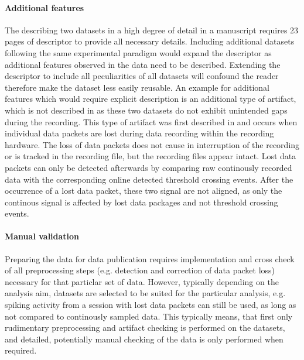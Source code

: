 \paragraph{Additional features}
The describing two datasets in a high degree of detail in a manuscript requires 23 pages of descriptor to provide all necessary details. Including additional datasets following the same experimental paradigm would expand the descriptor as additional features observed in the data need to be described. Extending the descriptor to include all peculiarities of all datasets will confound the reader therefore make the dataset less easily reusable.
An example for additional features which would require explicit description is an additional type of artifact, which is not described in \citet{Brochier_2018} as these two datasets do not exhibit unintended gaps during the recording. This type of artifact was first described in \citet{Sprenger_2014} and occurs when individual data packets are lost during data recording within the recording hardware. The loss of data packets does not cause in interruption of the recording or is tracked in the recording file, but the recording files appear intact. Lost data packets can only be detected afterwards by comparing raw continously recorded data with the corresponding online detected threshold crossing events. After the occurrence of a lost data packet, these two signal are not aligned, as only the continous signal is affected by lost data packages and not threshold crossing events.

\paragraph{Manual validation}
Preparing the data for data publication requires implementation and cross check of all preprocessing steps (e.g. detection and correction of data packet loss) necessary for that particlar set of data. However, typically depending on the analysis aim, datasets are selected to be suited for the particular analysis, e.g. spiking activity from a session with lost data packets can still be used, as long as not compared to continously sampled data.  This typically means, that first only rudimentary preprocessing and artifact checking is performed on the datasets, and detailed, potentially manual checking of the data is only performed when required. 

